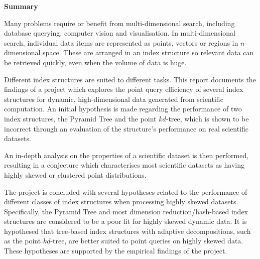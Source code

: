 \begin{center}
    {\LARGE\bf Summary}
\end{center}

Many problems require or benefit from multi-dimensional search, including database querying, computer vision and visualisation. In multi-dimensional search, individual data items are represented as points, vectors or regions in $n$-dimensional space. These are arranged in an index structure so relevant data can be retrieved quickly, even when the volume of data is huge.

Different index structures are suited to different tasks. This report documents the findings of a project which explores the point query efficiency of several index structures for dynamic, high-dimensional data generated from scientific computation. An initial hypothesis is made regarding the performance of two index structures, the Pyramid Tree and the point $kd$-tree, which is shown to be incorrect through an evaluation of the structure's performance on real scientific datasets.

An in-depth analysis on the properties of a scientific dataset is then performed, resulting in a conjecture which characterises most scientific datasets as having highly skewed or clustered point distributions.

The project is concluded with several hypotheses related to the performance of different classes of index structures when processing highly skewed datasets. Specifically, the Pyramid Tree and most dimension reduction/hash-based index structures are considered to be a poor fit for highly skewed dynamic data. It is hypothesed that tree-based index structures with adaptive decompositions, such as the point $kd$-tree, are better suited to point queries on highly skewed data. These hypotheses are supported by the empirical findings of the project.